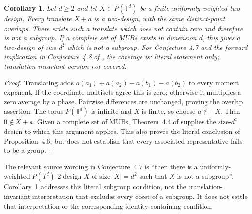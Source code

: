 \documentclass[11pt]{article}
\newtheorem{corollary}[theorem]{Corollary}
\newcommand{\T}{\mathbb T}
\begin{document}
\begin{corollary}\label{cor:translation}
Let $d\geq2$ and let $X\subset P(\T^d)$ be a finite uniformly weighted two-design. Every translate $X+a$ is a two-design, with the same distinct-point overlaps. There exists such a translate which does not contain zero and therefore is not a subgroup. If a complete set of MUBs exists in dimension $d$, this gives a two-design of size $d^2$ which is not a subgroup. For Conjecture~4.7 and the forward implication in Conjecture~4.8 of \cite[Section~4.3, p.~15]{iosue}, the coverage is: literal statement only; translation-invariant version not covered.
\end{corollary}
\begin{proof}
Translating adds $a(a_1)+a(a_2)-a(b_1)-a(b_2)$ to every moment exponent. If the coordinate multisets agree this is zero; otherwise it multiplies a zero average by a phase. Pairwise differences are unchanged, proving the overlap assertion. The torus $P(\T^d)$ is infinite and $X$ is finite, so choose $a\notin-X$. Then $0\notin X+a$. Given a complete set of MUBs, Theorem~4.4 of \cite{iosue} supplies the size-$d^2$ design to which this argument applies. This also proves the literal conclusion of Proposition~4.6, but does not establish that every associated representative fails to be a group.
\end{proof}

The relevant source wording in Conjecture~4.7 is ``then there is a uniformly-weighted $P(T^d)$ 2-design $X$ of size $|X|=d^2$ such that $X$ is not a subgroup''. Corollary~\ref{cor:translation} addresses this literal subgroup condition, not the translation-invariant interpretation that excludes every coset of a subgroup. It does not settle that interpretation or the corresponding identity-containing condition.
\end{document}
